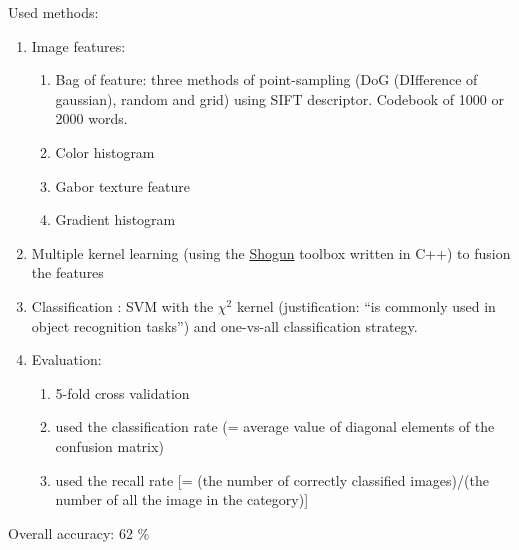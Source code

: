 Used methods:
\begin{enumerate}
    \item Image features:
    \begin{enumerate}
        \item Bag of feature: three methods of point-sampling (DoG (DIfference of gaussian), random and grid) using SIFT descriptor. Codebook of 1000 or 2000 words.
        \item Color histogram
        \item Gabor texture feature
        \item Gradient histogram
    \end{enumerate}

    \item Multiple kernel learning (using the  \href{https://cs.anu.edu.au/few/KSikka_EmotiW.pdf}{Shogun} toolbox written in C++) to fusion the features
    
    \item Classification : SVM with the $\chi^2 $ kernel (justification: “is commonly used in object recognition tasks”) and one-vs-all classification strategy.
    
    \item Evaluation:
    \begin{enumerate}
        \item 5-fold cross validation
        \item used the classification rate (= average value of diagonal elements of the confusion matrix)
        \item used the recall rate [= (the number of correctly classified images)/(the number of all the image in the category)]
    \end{enumerate}
\end{enumerate}
Overall accuracy: 62 \%